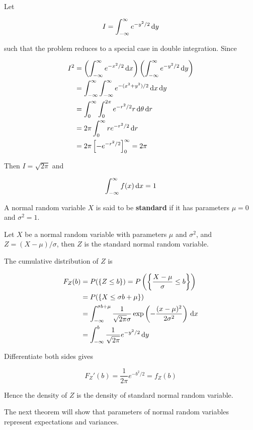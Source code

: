 \documentclass[a4paper,12pt]{article}
\begin{document}
Let

$$I=\int_{-\infty}^{\infty}e^{-y^{2}/2}\,\mathrm{d} y$$\s

such that the problem reduces to a special case in double integration. Since

$$\begin{aligned}[t]
  I^{2}&=\left( \int_{-\infty}^{\infty}e^{-x^{2}/2}\,\mathrm{d} x\right)\left( \int_{-\infty}^{\infty}e^{-y^{2}/2}\,\mathrm{d} y\right)\\
  &=\int_{-\infty}^{\infty}\int_{-\infty}^{\infty}e^{-(x^{2}+y^{2})/2}\,\mathrm{d} x\,\mathrm{d} y\\
  &=\int_{0}^{\infty}\int_{0}^{2\pi}e^{-r^{2}/2}r\,\mathrm{d}\theta\,\mathrm{d} r\\
  &=2\pi\int_{0}^{\infty}re^{-r^{2}/2}\,\mathrm{d} r\\
  &=2\pi\left[ -e^{-r^{2}/2}\right]_{0}^{\infty}=2\pi
\end{aligned}$$\s

Then $I=\sqrt{2\pi}$ and

$$\int_{-\infty}^{\infty}f(x)\,\mathrm{d} x=1$$\s

\begin{dft}
  A normal random variable $X$ is said to be \textbf{standard} if it has parameters $\mu=0$ and $\sigma^{2}=1$.
\end{dft}\n

\begin{pst}
  Let $X$ be a normal random variable with parameters $\mu$ and $\sigma^{2}$, and $Z=(X-\mu)/\sigma$, then $Z$ is the standard normal random variable.\n

  \prf The cumulative distribution of $Z$ is

  $$\begin{aligned}[t]
    F_{Z}(b)&=P(\left\{ Z\leq b\right\})=P\left( \left\{ \frac{X-\mu}{\sigma}\leq b\right\}\right)\\
    &=P(\left\{ X\leq \sigma b+\mu\right\})\\
    &=\int_{-\infty}^{\sigma b+\mu}\frac{1}{\sqrt{2\pi}\sigma}\exp\left( -\frac{(x-\mu)^{2}}{2\sigma^{2}}\right)\,\mathrm{d} x\\
    &=\int_{-\infty}^{b}\frac{1}{\sqrt{2\pi}}e^{-y^{2}/2}\,\mathrm{d} y
  \end{aligned}$$\s

  Differentiate both sides gives

  $$F_{Z}'(b)=\frac{1}{2\pi}e^{-b^{2}/2}=f_{Z}(b)$$\s
  
  Hence the density of $Z$ is the density of standard normal random variable.
\end{pst}\n

The next theorem will show that parameters of normal random variables represent expectations and variances.\n
\end{document}
